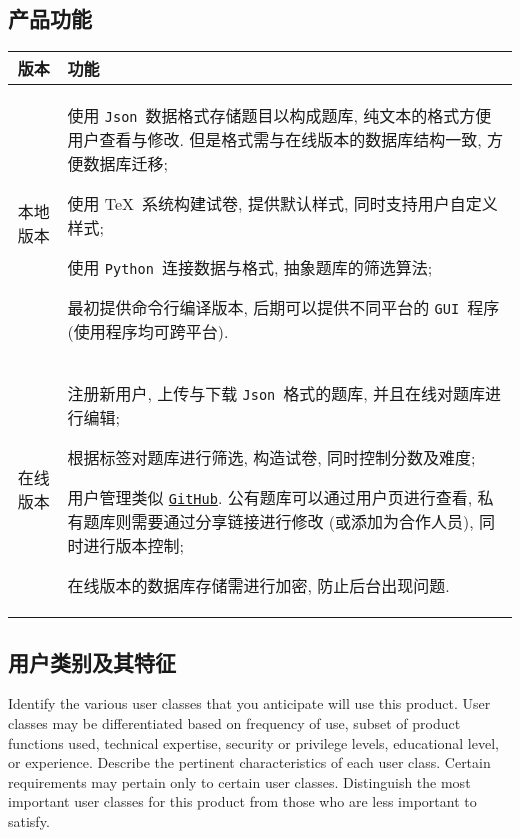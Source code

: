 \documentclass{ctexart}
\newcommand{\github}{\texttt{GitHub}}
\newcommand{\python}{\texttt{Python}}
\newcommand{\json}{\texttt{Json}}
\newcommand{\gui}{\texttt{GUI}}
\begin{document}
\subsection{产品功能}
\begin{center}
    \begin{tabularx}{\textwidth}{cX}
        \toprule
            版本 & 功能 \\
        \midrule
        \rowcolor[HTML]{EFEFEF}
            本地版本 & \begin{itemize*}[itemjoin={\newline}]
                    \item 使用 \json\ 数据格式存储题目以构成题库, 纯文本的格式方便用户查看与修改. 但是格式需与在线版本的数据库结构一致, 方便数据库迁移;
                    \item 使用 \TeX\ 系统构建试卷, 提供默认样式, 同时支持用户自定义样式;
                    \item 使用 \python\ 连接数据与格式, 抽象题库的筛选算法;
                    \item 最初提供命令行编译版本, 后期可以提供不同平台的 \gui\ 程序 (使用程序均可跨平台).
                \end{itemize*} \\
            在线版本 & \begin{itemize*}[itemjoin={\newline}]
                    \item 注册新用户, 上传与下载 \json\ 格式的题库, 并且在线对题库进行编辑;
                    \item 根据标签对题库进行筛选, 构造试卷, 同时控制分数及难度;
                    \item 用户管理类似 \href{https://github.com/Iydon}{\github}. 公有题库可以通过用户页进行查看, 私有题库则需要通过分享链接进行修改 (或添加为合作人员), 同时进行版本控制;
                    \item 在线版本的数据库存储需进行加密, 防止后台出现问题.
                \end{itemize*} \\
        \bottomrule
    \end{tabularx}
\end{center}


\subsection{用户类别及其特征}
Identify the various user classes that you anticipate will use this product.  
User classes may be differentiated based on frequency of use, subset of product 
functions used, technical expertise, security or privilege levels, educational 
level, or experience. Describe the pertinent characteristics of each user class.  
Certain requirements may pertain only to certain user classes. Distinguish the 
most important user classes for this product from those who are less important 
to satisfy.
\end{document}

